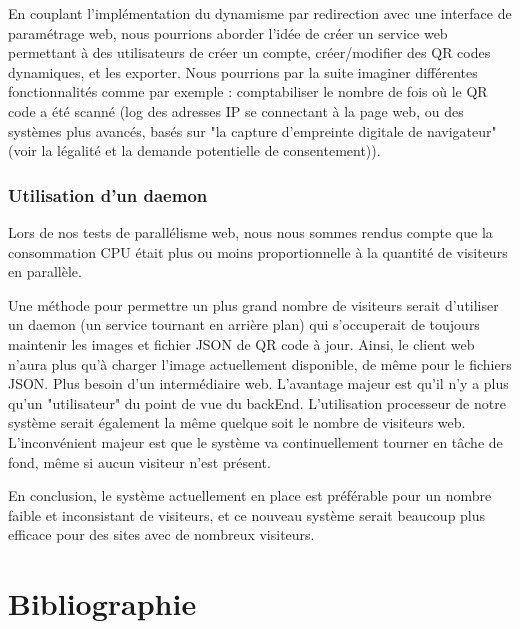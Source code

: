 \documentclass[a4paper,12pt]{article}
\begin{document}
\newpage

\noindent En couplant l'implémentation du dynamisme par redirection avec une interface de paramétrage web, nous pourrions aborder l'idée de créer un service web permettant à des utilisateurs de créer un compte, créer/modifier des QR codes dynamiques, et les exporter. Nous pourrions par la suite imaginer différentes fonctionnalités comme par exemple : comptabiliser le nombre de fois où le QR code a été scanné (log des adresses IP se connectant à la page web, ou des systèmes plus avancés, basés sur "la capture d'empreinte digitale de navigateur" (voir la légalité et la demande potentielle de consentement)).

\subsubsection{Utilisation d'un daemon}
\label{daemon}

\noindent Lors de nos tests de parallélisme web, nous nous sommes rendus compte que la consommation CPU était plus ou moins proportionnelle à la quantité de visiteurs en parallèle.

\noindent Une méthode pour permettre un plus grand nombre de visiteurs serait d'utiliser un daemon (un service tournant en arrière plan) qui s'occuperait de toujours maintenir les images et fichier JSON de QR code à jour. Ainsi, le client web n'aura plus qu'à charger l'image actuellement disponible, de même pour le fichiers JSON. Plus besoin d'un intermédiaire web. L'avantage majeur est qu'il n'y a plus qu'un "utilisateur" du point de vue du backEnd. L'utilisation processeur de notre système serait également la même quelque soit le nombre de visiteurs web. L'inconvénient majeur est que le système va continuellement tourner en tâche de fond, même si aucun visiteur n'est présent.

\noindent En conclusion, le système actuellement en place est préférable pour un nombre faible et inconsistant de visiteurs, et ce nouveau système serait beaucoup plus efficace pour des sites avec de nombreux visiteurs.

\newpage

\section{Bibliographie}
\end{document}
